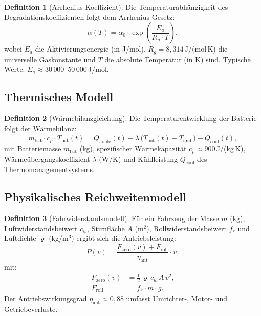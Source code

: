 ﻿\documentclass[a4paper,12pt]{article}
\theoremstyle{definition}
\newtheorem{definition}{Definition}
\begin{document}
\begin{definition}[Arrhenius-Koeffizient]
  Die Temperaturabh\"angigkeit des Degradationskoeffizienten folgt dem
  Arrhenius-Gesetz:
  \[
    \alpha(T) = \alpha_0 \cdot \exp\!\left(\frac{E_a}{R_g \cdot T}\right),
  \]
  wobei $E_a$ die Aktivierungsenergie (in J/mol), $R_g = 8{,}314$\,J/(mol\,K)
  die universelle Gaskonstante und $T$ die absolute Temperatur (in K) sind.
  Typische Werte: $E_a \approx 30\,000$--$50\,000$\,J/mol.
\end{definition}

\subsection{Thermisches Modell}

\begin{definition}[W\"armebilanzgleichung]
  Die Temperaturentwicklung der Batterie folgt der W\"armebilanz:
  \[
    m_{\mathrm{bat}} \cdot c_p \cdot \dot{T}_{\mathrm{bat}}(t)
    = \dot{Q}_{\mathrm{Joule}}(t)
      - \lambda\,\bigl(T_{\mathrm{bat}}(t) - T_{\mathrm{amb}}\bigr)
      - \dot{Q}_{\mathrm{cool}}(t),
  \]
  mit Batteriemasse $m_{\mathrm{bat}}$ (kg), spezifischer W\"armekapazit\"at
  $c_p \approx 900$\,J/(kg\,K), W\"arme\"ubergangskoeffizient $\lambda$
  (W/K) und Kühlleistung $\dot{Q}_{\mathrm{cool}}$ des Thermomanagementsystems.
\end{definition}

\subsection{Physikalisches Reichweitenmodell}

\begin{definition}[Fahrwiderstandsmodell]
  F\"ur ein Fahrzeug der Masse $m$ (kg), Luftwiderstandsbeiwert $c_w$,
  Stirnfl\"ache $A$ (m$^2$), Rollwiderstandsbeiwert $f_r$ und
  Luftdichte $\varrho$ (kg/m$^3$) ergibt sich die Antriebsleistung:
  \[
    P(v) = \frac{F_{\mathrm{aero}}(v) + F_{\mathrm{roll}}}{\eta_{\mathrm{ant}}} \cdot v,
  \]
  mit:
  \begin{align*}
    F_{\mathrm{aero}}(v) &= \tfrac{1}{2}\,\varrho\, c_w\, A\, v^2, \\
    F_{\mathrm{roll}}    &= f_r \cdot m \cdot g.
  \end{align*}
  Der Antriebswirkungsgrad $\eta_{\mathrm{ant}} \approx 0{,}88$ umfasst
  Umrichter-, Motor- und Getriebeverluste.
\end{definition}
\end{document}
